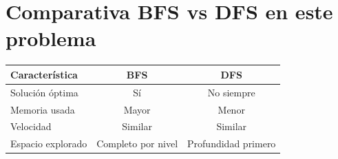 \documentclass[12pt,a4paper]{article}
\begin{document}
\section{Comparativa BFS vs DFS en este problema}

\begin{center}
\begin{tabular}{|l|c|c|}
\hline
\textbf{Característica} & \textbf{BFS} & \textbf{DFS} \\
\hline
Solución óptima & Sí & No siempre \\
Memoria usada & Mayor & Menor \\
Velocidad & Similar & Similar \\
Espacio explorado & Completo por nivel & Profundidad primero \\
\hline
\end{tabular}
\end{center}
\end{document}
